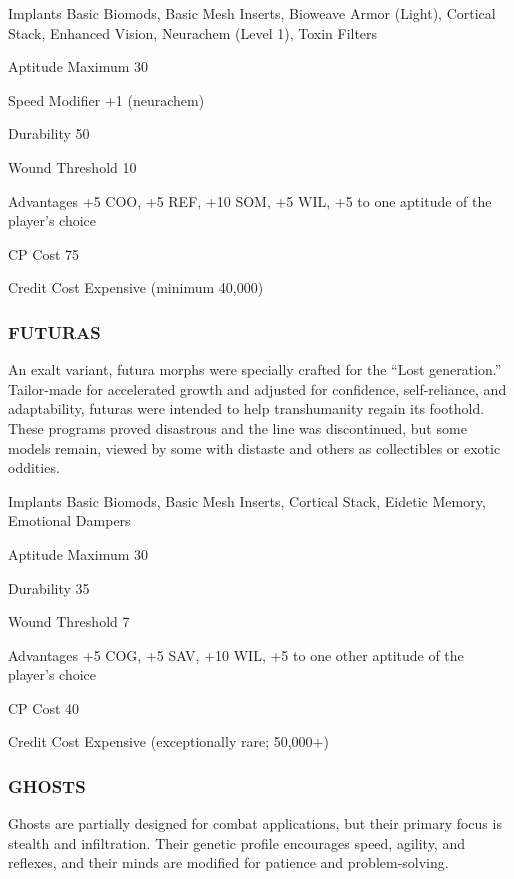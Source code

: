 \begin{description*}
\item[Implants] Basic Biomods, Basic Mesh Inserts, Bioweave Armor (Light),
  Cortical Stack, Enhanced Vision, Neurachem (Level 1), Toxin Filters
\item[Aptitude Maximum] 30  
\item[Speed Modifier] +1 (neurachem) 
\item[Durability] 50 
\item[Wound Threshold] 10 
\item[Advantages] +5 COO, +5 REF, +10 SOM, +5 WIL, +5 to one aptitude of the
  player’s choice
\item[CP Cost] 75 
\item[Credit Cost] Expensive (minimum 40,000) 
\end{description*}

\subsubsection{FUTURAS}
An exalt variant, futura morphs were specially crafted for the “Lost
generation.” Tailor-made for accelerated growth and adjusted for confidence,
self-reliance, and adaptability, futuras were intended to help transhumanity
regain its foothold. These programs proved disastrous and the line was
discontinued, but some models remain, viewed by some with distaste and others
as collectibles or exotic oddities.

\begin{description*}
\item[Implants] Basic Biomods, Basic Mesh Inserts, Cortical Stack, Eidetic
  Memory, Emotional Dampers
\item[Aptitude Maximum] 30 
\item[Durability] 35 
\item[Wound Threshold] 7 
\item[Advantages] +5 COG, +5 SAV, +10 WIL, +5 to one other aptitude of the
  player’s choice
\item[CP Cost] 40 
\item[Credit Cost] Expensive (exceptionally rare; 50,000+) 
\end{description*}

\subsubsection{GHOSTS}
Ghosts are partially designed for combat applications, but their primary focus
is stealth and infiltration.  Their genetic profile encourages speed, agility,
and reflexes, and their minds are modified for patience and problem-solving.

